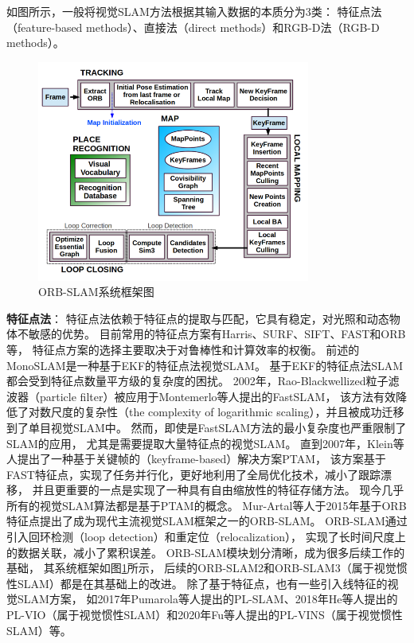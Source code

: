 如图所示，一般将视觉SLAM方法根据其输入数据的本质分为3类\cite{servieres2021visual}：
特征点法（feature-based methods）、直接法（direct methods）和RGB-D法（RGB-D methods）。

\begin{figure}[htbp]
    \centering
    \includegraphics[width = 0.8\textwidth]{figures/orb_slam_system_overview.png}
    \caption{ORB-SLAM系统框架图\cite{mur2015orb}}
    \label{fig:orb_slam_system_overview}
\end{figure}

\textbf{特征点法}：
特征点法依赖于特征点的提取与匹配，它具有稳定，对光照和动态物体不敏感的优势。
目前常用的特征点方案有Harris\cite{si1988combined}、SURF\cite{bay2006surf}、SIFT\cite{lowe2004distinctive}、FAST\cite{rosten2006machine}和ORB\cite{rublee2011orb}等，
特征点方案的选择主要取决于对鲁棒性和计算效率的权衡。
前述的MonoSLAM\cite{davison2007monoslam}是一种基于EKF的特征点法视觉SLAM。
基于EKF的特征点法SLAM都会受到特征点数量平方级的复杂度的困扰。
2002年，Rao-Blackwellized粒子滤波器（particle filter）被应用于Montemerlo等人提出的FastSLAM\cite{montemerlo2002fastslam}，
该方法有效降低了对数尺度的复杂性（the complexity of logarithmic scaling），并且被成功迁移到了单目视觉SLAM中\cite{eade2006scalable}。
然而，即使是FastSLAM方法的最小复杂度也严重限制了SLAM的应用，
尤其是需要提取大量特征点的视觉SLAM。
直到2007年，Klein等人提出了一种基于关键帧的（keyframe-based）解决方案PTAM\cite{klein2007parallel}，
该方案基于FAST特征点，实现了任务并行化，更好地利用了全局优化技术，减小了跟踪漂移，
并且更重要的一点是实现了一种具有自由缩放性的特征存储方法。
现今几乎所有的视觉SLAM算法都是基于PTAM的概念。
Mur-Artal等人于2015年基于ORB特征点提出了成为现代主流视觉SLAM框架之一的ORB-SLAM\cite{mur2015orb}。
ORB-SLAM通过引入回环检测（loop detection）和重定位（relocalization），
实现了长时间尺度上的数据关联，减小了累积误差。
ORB-SLAM模块划分清晰，成为很多后续工作的基础，
其系统框架如图\ref{fig:orb_slam_system_overview}所示，
后续的ORB-SLAM2\cite{mur2017orb}和ORB-SLAM3\cite{campos2021orb}（属于视觉惯性SLAM）都是在其基础上的改进。
除了基于特征点，也有一些引入线特征的视觉SLAM方案，
如2017年Pumarola等人提出的PL-SLAM\cite{pumarola2017pl}、2018年He等人提出的PL-VIO\cite{he2018pl}（属于视觉惯性SLAM）和2020年Fu等人提出的PL-VINS\cite{fu2020pl}（属于视觉惯性SLAM）等。

